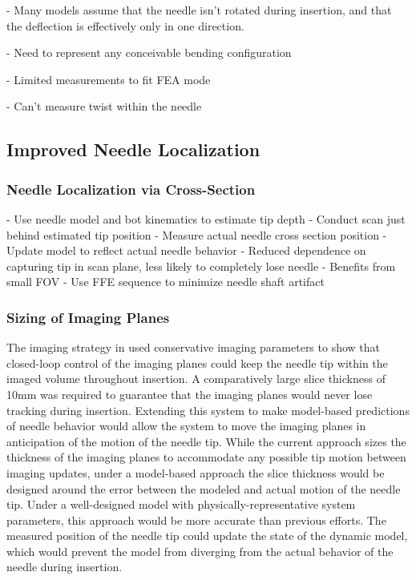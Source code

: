 - Many models assume that the needle isn't rotated during insertion, and that the deflection is effectively only in one direction.

- Need to represent any conceivable bending configuration

- Limited measurements to fit FEA mode

- Can't measure twist within the needle

\subsection{Improved Needle Localization}

\subsubsection{Needle Localization via Cross-Section}
- Use needle model and bot kinematics to estimate tip depth
- Conduct scan just behind estimated tip position
- Measure actual needle cross section position
- Update model to reflect actual needle behavior
- Reduced dependence on capturing tip in scan plane, less likely to completely lose needle
- Benefits from small FOV
- Use FFE sequence to minimize needle shaft artifact 

\subsubsection{Sizing of Imaging Planes}
The imaging strategy in \cite{AIMNeedleSteering} used conservative imaging parameters to show that closed-loop control of the imaging planes could keep the needle tip within the imaged volume throughout insertion. A comparatively large slice thickness of 10mm was required to guarantee that the imaging planes would never lose tracking during insertion. Extending this system to make model-based predictions of needle behavior would allow the system to move the imaging planes in anticipation of the motion of the needle tip. While the current approach sizes the thickness of the imaging planes to accommodate any possible tip motion between imaging updates, under a model-based approach the slice thickness would be designed around the error between the modeled and actual motion of the needle tip. Under a well-designed model with physically-representative system parameters, this approach would be more accurate than previous efforts. The measured position of the needle tip could update the state of the dynamic model, which would prevent the model from diverging from the actual behavior of the needle during insertion.

